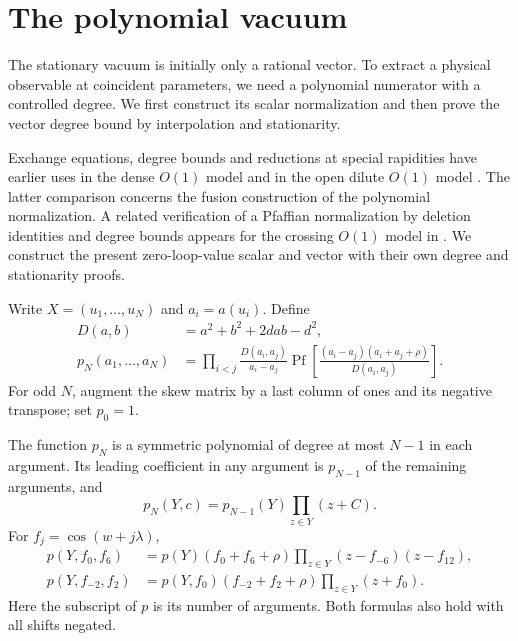 \section{The polynomial vacuum}\label{sec:vacuum}

The stationary vacuum is initially only a rational vector. To extract a physical observable at coincident parameters, we need a polynomial numerator with a controlled degree. We first construct its scalar normalization and then prove the vector degree bound by interpolation and stationarity.


Exchange equations, degree bounds and reductions at special rapidities
have earlier uses in the dense $O(1)$ model
\cite{DiFrancescoZinnJustin2005} and in the open dilute $O(1)$ model
\cite{GarbaliNienhuis2017Ground,GarbaliNienhuis2017Sum}.
The latter comparison concerns the fusion construction of the polynomial
normalization. A related verification of a Pfaffian normalization by
deletion identities and degree bounds appears for the crossing $O(1)$
model in \cite[Section~2.6]{DiFrancesco2005Open}.
We construct the present zero-loop-value scalar and vector
with their own degree and stationarity proofs.

Write $X=(u_1,\ldots,u_N)$ and $a_i=a(u_i)$. Define
\begin{equation}\label{eq:01-pfaffian}
\begin{split}
 D(a,b)&=a^2+b^2+2dab-d^2,\\
 p_N(a_1,\ldots,a_N)
 &=\prod_{i<j}\frac{D(a_i,a_j)}{a_i-a_j}
   \operatorname{Pf}\left[
    \frac{(a_i-a_j)(a_i+a_j+\rho)}{D(a_i,a_j)}
   \right].
\end{split}
\end{equation}
For odd $N$, augment the skew matrix by a last column of ones and its
negative transpose; set $p_0=1$.

\begin{lemma}\label{lem:scalar-reductions}
The function $p_N$ is a symmetric polynomial of degree at most $N-1$
in each argument. Its leading coefficient in any argument is
$p_{N-1}$ of the remaining arguments, and
\begin{equation}\label{eq:01-scalar-flat}
 p_N(Y,c)=p_{N-1}(Y)\prod_{z\in Y}(z+C).
\end{equation}
For $f_j=\cos(w+j\lambda)$,
\begin{align}
 p(Y,f_0,f_6)
 &=p(Y)(f_0+f_6+\rho)
       \prod_{z\in Y}(z-f_{-6})(z-f_{12}),
       \label{eq:01-scalar-delete}\\
 p(Y,f_{-2},f_2)
 &=p(Y,f_0)(f_{-2}+f_2+\rho)
       \prod_{z\in Y}(z+f_0).
       \label{eq:01-scalar-merge}
\end{align}
Here the subscript of $p$ is its number of arguments. Both formulas
also hold with all shifts negated.
\end{lemma}


